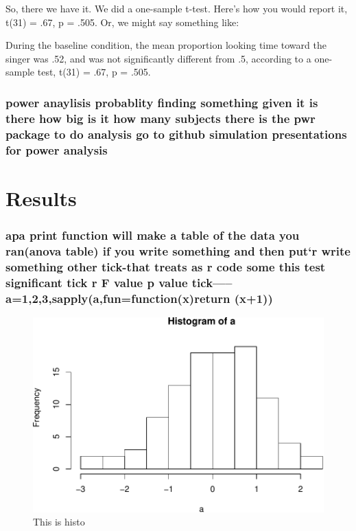 \documentclass[man]{apa6}
\begin{document}
So, there we have it. We did a one-sample t-test. Here's how you would
report it, t(31) = .67, p = .505. Or, we might say something like:

During the baseline condition, the mean proportion looking time toward
the singer was .52, and was not significantly different from .5,
according to a one-sample test, t(31) = .67, p = .505.

\subsubsection{power anaylisis probablity finding something given it is
there how big is it how many subjects there is the pwr package to do
analysis go to github simulation presentations for power
analysis}\label{power-anaylisis-probablity-finding-something-given-it-is-there-how-big-is-it-how-many-subjects-there-is-the-pwr-package-to-do-analysis-go-to-github-simulation-presentations-for-power-analysis}

\section{Results}\label{results}

\subsubsection{apa print function will make a table of the data you
ran(anova table) if you write something and then put`r write something
other tick-that treats as r code some this test significant tick r F
value p value tick-----a=1,2,3,sapply(a,fun=function(x)return
(x+1))}\label{apa-print-function-will-make-a-table-of-the-data-you-rananova-table-if-you-write-something-and-then-putr-write-something-other-tick-that-treats-as-r-code-some-this-test-significant-tick-r-f-value-p-value-ticka123sapplyafunfunctionxreturn-x1}

\begin{figure}
\centering
\includegraphics{Papa_files/figure-latex/myfig-1.pdf}
\caption{\label{fig:myfig}This is histo}
\end{figure}
\end{document}
